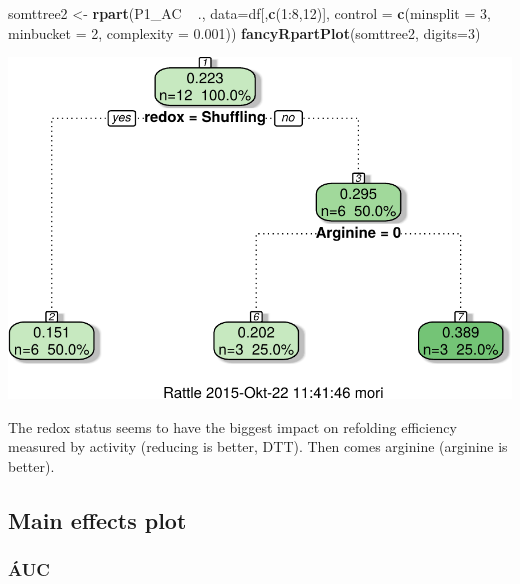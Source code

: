 \documentclass[]{article}
\newenvironment{Shaded}{\begin{snugshade}}{\end{snugshade}}
\newcommand{\KeywordTok}[1]{\textcolor[rgb]{0.13,0.29,0.53}{\textbf{{#1}}}}
\newcommand{\DataTypeTok}[1]{\textcolor[rgb]{0.13,0.29,0.53}{{#1}}}
\newcommand{\DecValTok}[1]{\textcolor[rgb]{0.00,0.00,0.81}{{#1}}}
\newcommand{\FloatTok}[1]{\textcolor[rgb]{0.00,0.00,0.81}{{#1}}}
\newcommand{\StringTok}[1]{\textcolor[rgb]{0.31,0.60,0.02}{{#1}}}
\newcommand{\NormalTok}[1]{{#1}}
\begin{document}
\begin{Shaded}
\begin{Highlighting}[]
\NormalTok{somttree2 <-}\StringTok{ }\KeywordTok{rpart}\NormalTok{(P1_AC ~}\StringTok{ }\NormalTok{., }
                \DataTypeTok{data=}\NormalTok{df[,}\KeywordTok{c}\NormalTok{(}\DecValTok{1}\NormalTok{:}\DecValTok{8}\NormalTok{,}\DecValTok{12}\NormalTok{)],}
                \DataTypeTok{control =} \KeywordTok{c}\NormalTok{(}\DataTypeTok{minsplit =} \DecValTok{3}\NormalTok{,}
                            \DataTypeTok{minbucket =} \DecValTok{2}\NormalTok{,}
                            \DataTypeTok{complexity =} \FloatTok{0.001}\NormalTok{))}
\KeywordTok{fancyRpartPlot}\NormalTok{(somttree2, }\DataTypeTok{digits=}\DecValTok{3}\NormalTok{)}
\end{Highlighting}
\end{Shaded}

\includegraphics{analysis_files/figure-latex/unnamed-chunk-8-1.pdf}

The redox status seems to have the biggest impact on refolding
efficiency measured by activity (reducing is better, DTT). Then comes
arginine (arginine is better).

\subsection{Main effects plot}\label{main-effects-plot-1}

\subsubsection{ÁUC}\label{auc}
\end{document}
